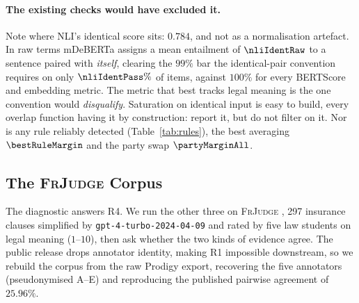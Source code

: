 \documentclass[11pt]{article}
\begin{document}
\paragraph{The existing checks would have excluded it.}
Note where NLI's identical score sits: $0.784$, and not as a normalisation
artefact. In raw terms mDeBERTa assigns a mean entailment of $\nliIdentRaw$ to a
sentence paired with \emph{itself}, clearing the $99\%$ bar the identical-pair
convention requires on only $\nliIdentPass\%$ of items, against $100\%$ for
every BERTScore and embedding metric. The metric that best tracks legal meaning
is the one convention would \emph{disqualify}. Saturation on identical input is
easy to build, every overlap function having it by construction: report it, but
do not filter on it. Nor is any rule reliably detected
(Table~\ref{tab:rules}), the best averaging $\bestRuleMargin$ and the party swap
$\partyMarginAll$.

\begin{table}[tb]\centering\footnotesize

\caption{Calibrated comparison on the \textsc{FrJudge} test split ($\testN$
items), mean over 10 seeds; all ten unsupervised metrics are in the
supplementary material. RMSE$_{\text{raw}}$ is the decimal-scaling protocol in
current use, RMSE$_{\text{cal}}$ the isotonic map of R2.}
\label{tab:baselines}
\end{table}

\subsection{The \textsc{FrJudge} Corpus}
\label{sec:casestudy}

The diagnostic answers R4. We run the other three on \textsc{FrJudge}
\citep{beauchemin2025judgebert}, 297 insurance clauses simplified by
\texttt{gpt-4-turbo-2024-04-09} and rated by five law students on legal meaning
($1$--$10$), then ask whether the two kinds of evidence agree. The public
release drops annotator identity, making R1 impossible downstream, so we rebuild
the corpus from the raw Prodigy export, recovering the five annotators
(pseudonymised A--E) and reproducing the published pairwise agreement of
$25.96\%$.
\end{document}
